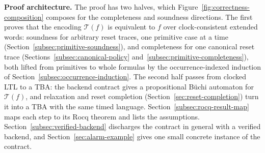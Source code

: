 \documentclass[manuscript]{acmart}
\newcommand{\T}{\mathcal{T}}
\newcommand{\runinhead}[1]{\par\noindent\textbf{#1}\enspace}
\begin{document}
\runinhead{Proof architecture.} The proof has two halves, which
Figure~\ref{fig:correctness-composition} composes for the completeness and
soundness directions. The first proves that the encoding
$\T(f)$ is equivalent to $f$ over clock-consistent extended words:
soundness for arbitrary reset traces, one primitive case at a time
(Section~\ref{subsec:primitive-soundness}), and completeness for one canonical
reset trace (Sections~\ref{subsec:canonical-policy}
and~\ref{subsec:primitive-completeness}), both lifted from primitives to whole
formulas by the occurrence-indexed induction of
Section~\ref{subsec:occurrence-induction}. The second half passes from clocked
LTL to a TBA: the backend contract gives a propositional B\"uchi automaton for
$\T(f)$, and relaxation and reset completion
(Section~\ref{sec:reset-completion}) turn it into a TBA with the same timed
language. Section~\ref{subsec:rocq-result-map} maps each step to its Rocq
theorem and lists the assumptions. Section~\ref{subsec:verified-backend} discharges the
contract in general with a verified backend, and Section~\ref{sec:alarm-example}
gives one small concrete instance of the contract.
\end{document}
